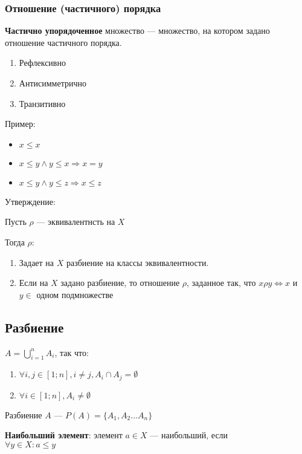 \documentclass{article}
\begin{document}
\subsubsection{Отношение (частичного) порядка}

\textbf{Частично упорядоченное} множество --- множество, на котором задано отношение частичного порядка.

\begin{enumerate}
	\item Рефлексивно
	\item Антисимметрично
	\item Транзитивно
\end{enumerate}

Пример:

\begin{itemize}
	\item $x \le x$
	\item $x \le y \land y \le x \Rightarrow x = y$
	\item $x \le y \land y \le z \Rightarrow x \le z$
\end{itemize}

{\Large Утверждение:}

Пусть $\rho$ --- эквивалентнсть на $X$

Тогда $\rho$:

\begin{enumerate}
	\item Задает на $X$ разбиение на классы эквивалентности.
	\item Если на $X$ задано разбиение, то отношение $\rho$, заданное так, что $x \rho y \Leftrightarrow x$ и $y \in$ одном подмножестве
\end{enumerate}

\subsection{Разбиение}

$A = \bigcup \limits_{i = 1}^n A_i$, так что:

\begin{enumerate}
	\item $\forall i, j \in [1; n], i \ne j, A_i \cap A_j = \emptyset$
	\item $\forall i \in [1; n], A_i \ne \emptyset$
\end{enumerate}

Разбиение $A$ --- $P(A) = \{A_1, A_2 \dots A_n\}$

\textbf{Наибольший элемент}: элемент $a \in X$ --- наибольший, если \\
$\forall y \in X : a \le y$
\end{document}
